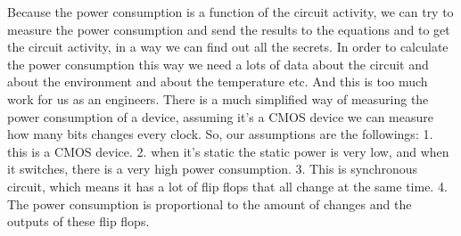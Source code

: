 Because the power consumption is a function of the circuit activity, we can try to measure the power consumption and send the results to the equations and to get the circuit activity, in a way we can find out all the secrets.
In order to calculate the power consumption this way we need a lots of data about the circuit and about the environment and about the temperature etc. And this is too much work for us as an engineers. There is a much simplified way of measuring the power consumption of a device, assuming it's a CMOS device we can measure how many bits changes every clock.
So, our assumptions are the followings: 1. this is a CMOS device. 2. when it’s static the static power is very low, and when it switches, there is a very high power consumption. 3. This is synchronous circuit, which means it has a lot of flip flops that all change at the same time. 4. The power consumption is proportional to the amount of changes and the outputs of these flip flops.
